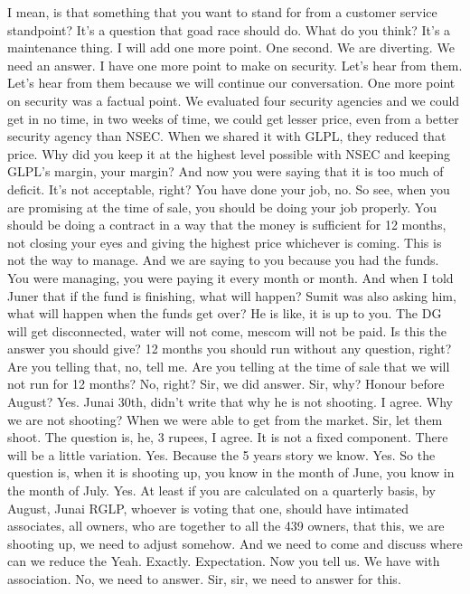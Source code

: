 I mean, is that something that you want to stand for from a customer service standpoint?
It's a question that goad race should do.
What do you think?
It's a maintenance thing.
I will add one more point.
One second.
We are diverting.
We need an answer.
I have one more point to make on security.
Let's hear from them.
Let's hear from them because we will continue our conversation.
One more point on security was a factual point.
We evaluated four security agencies and we could get in no time,
in two weeks of time, we could get lesser price,
even from a better security agency than NSEC.
When we shared it with GLPL, they reduced that price.
Why did you keep it at the highest level possible with NSEC
and keeping GLPL's margin, your margin?
And now you were saying that it is too much of deficit.
It's not acceptable, right?
You have done your job, no.
So see, when you are promising at the time of sale,
you should be doing your job properly.
You should be doing a contract in a way that the money is sufficient for 12 months,
not closing your eyes and giving the highest price whichever is coming.
This is not the way to manage.
And we are saying to you because you had the funds.
You were managing, you were paying it every month or month.
And when I told Juner that if the fund is finishing, what will happen?
Sumit was also asking him, what will happen when the funds get over?
He is like, it is up to you. The DG will get disconnected,
water will not come, mescom will not be paid.
Is this the answer you should give?
12 months you should run without any question, right?
Are you telling that, no, tell me.
Are you telling at the time of sale that we will not run for 12 months?
No, right?
Sir, we did answer.
Sir, why?
Honour before August?
Yes.
Junai 30th, didn't write that why he is not shooting.
I agree.
Why we are not shooting?
When we were able to get from the market.
Sir, let them shoot.
The question is, he, 3 rupees, I agree.
It is not a fixed component.
There will be a little variation.
Yes.
Because the 5 years story we know.
Yes.
So the question is, when it is shooting up, you know in the month of June,
you know in the month of July.
Yes.
At least if you are calculated on a quarterly basis,
by August, Junai RGLP, whoever is voting that one,
should have intimated associates, all owners,
who are together to all the 439 owners,
that this, we are shooting up, we need to adjust somehow.
And we need to come and discuss where can we reduce the
Yeah.
Exactly.
Expectation.
Now you tell us.
We have with association.
No, we need to answer.
Sir, sir, we need to answer for this.
